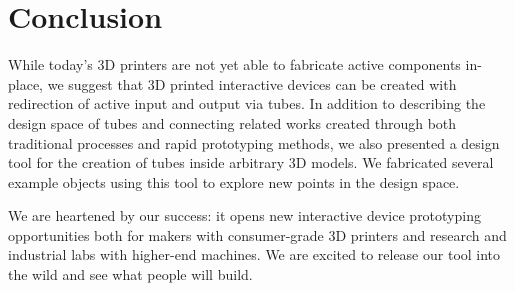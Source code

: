\section{Conclusion}


While today's 3D printers are not yet able to fabricate active components in-place, we suggest that 3D printed interactive devices can be created with redirection of active input and output via tubes.  In addition to describing the design space of tubes and connecting related works created through both traditional processes and rapid prototyping methods, we also presented a design tool for the creation of tubes inside arbitrary 3D models.  We fabricated several example objects using this tool to explore new points in the design space.

We are heartened by our success: it opens new interactive device prototyping opportunities both for makers with consumer-grade 3D printers and research and industrial labs with higher-end machines.  We are excited to release our tool into the wild and see what people will build.